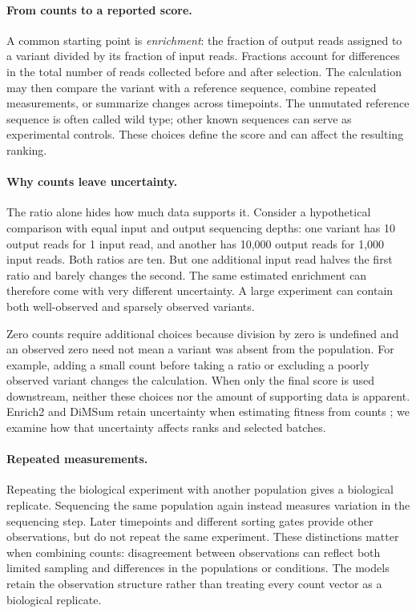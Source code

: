 \documentclass[11pt]{article}
\begin{document}
\paragraph{From counts to a reported score.}
A common starting point is \emph{enrichment}: the fraction of output reads
assigned to a variant divided by its fraction of input reads. Fractions
account for differences in the total number of reads collected before and
after selection. The calculation may then compare the variant with a
reference sequence, combine repeated measurements, or summarize changes
across timepoints. The unmutated reference sequence is often called wild
type; other known sequences can serve as experimental controls. These choices
define the score and can affect the resulting ranking.

\paragraph{Why counts leave uncertainty.}
The ratio alone hides how much data supports it. Consider a hypothetical
comparison with equal input and output sequencing depths: one variant has
10 output reads for 1 input read, and another has 10,000 output reads for
1,000 input reads. Both ratios are ten. But one additional input read
halves the first ratio and barely changes the second. The same estimated
enrichment can therefore come with very different uncertainty. A large
experiment can contain both well-observed and sparsely observed variants.

Zero counts require additional choices because division by zero is undefined
and an observed zero need not mean a variant was absent from the population.
For example, adding a small count before taking a ratio or excluding a
poorly observed variant changes the calculation. When only the final score
is used downstream, neither these choices nor the amount of supporting
data is apparent. Enrich2 and DiMSum retain uncertainty when estimating
fitness from counts \citep{rubin2017,faure2020}; we examine how that
uncertainty affects ranks and selected batches.

\paragraph{Repeated measurements.}
Repeating the biological experiment with another population gives a
biological replicate. Sequencing the same population again instead measures
variation in the sequencing step. Later timepoints and different sorting
gates provide other observations, but do not repeat the same experiment.
These distinctions matter when combining counts: disagreement between
observations can reflect both limited sampling and differences in the
populations or conditions. The models retain the observation structure
rather than treating every count vector as a biological replicate.
\end{document}
